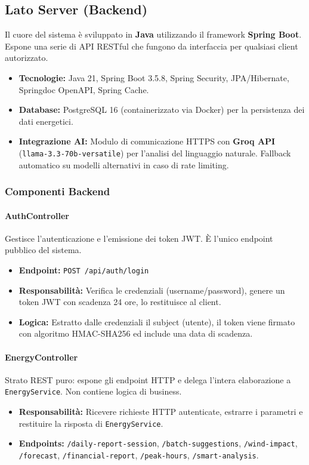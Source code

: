 \documentclass[a4paper,12pt]{report}
\begin{document}
\subsection{Lato Server (Backend)}
Il cuore del sistema è sviluppato in \textbf{Java} utilizzando il framework \textbf{Spring Boot}. Espone una serie di API RESTful che fungono da interfaccia per qualsiasi client autorizzato.
\begin{itemize}
    \item \textbf{Tecnologie:} Java 21, Spring Boot 3.5.8, Spring Security, JPA/Hibernate, Springdoc OpenAPI, Spring Cache.
    \item \textbf{Database:} PostgreSQL 16 (containerizzato via Docker) per la persistenza dei dati energetici.
    \item \textbf{Integrazione AI:} Modulo di comunicazione HTTPS con \textbf{Groq API} (\texttt{llama-3.3-70b-versatile}) per l'analisi del linguaggio naturale. Fallback automatico su modelli alternativi in caso di rate limiting.
\end{itemize}

\subsubsection{Componenti Backend}

\paragraph{AuthController}
Gestisce l'autenticazione e l'emissione dei token JWT. È l'unico endpoint pubblico del sistema.
\begin{itemize}
    \item \textbf{Endpoint:} \texttt{POST /api/auth/login}
    \item \textbf{Responsabilità:} Verifica le credenziali (username/password), genere un token JWT con scadenza 24 ore, lo restituisce al client.
    \item \textbf{Logica:} Estratto dalle credenziali il subject (utente), il token viene firmato con algoritmo HMAC-SHA256 ed include una data di scadenza.
\end{itemize}

\paragraph{EnergyController}
Strato REST puro: espone gli endpoint HTTP e delega l'intera elaborazione a \texttt{EnergyService}. Non contiene logica di business.
\begin{itemize}
    \item \textbf{Responsabilità:} Ricevere richieste HTTP autenticate, estrarre i parametri e restituire la risposta di \texttt{EnergyService}.
    \item \textbf{Endpoints:} \texttt{/daily-report-session}, \texttt{/batch-suggestions}, \texttt{/wind-impact}, \texttt{/forecast}, \texttt{/financial-report}, \texttt{/peak-hours}, \texttt{/smart-analysis}.
\end{itemize}
\end{document}
